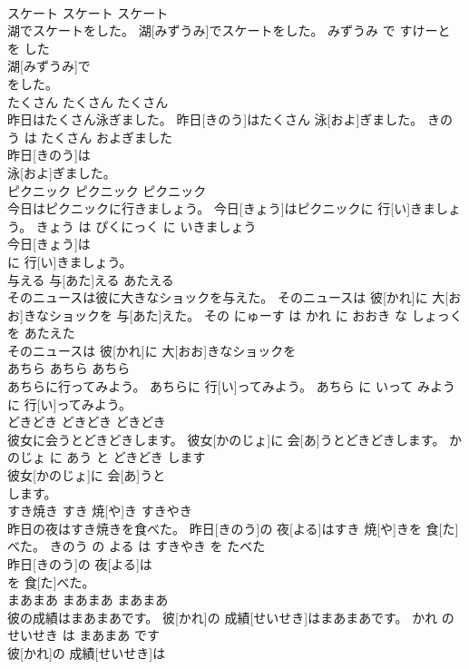 \documentclass[8pt]{extreport}
\begin{document}
\begin{CJK}{UTF8}{min}
\\	スケート	スケート	スケート	
\\	湖でスケートをした。	湖[みずうみ]でスケートをした。	みずうみ で すけーと を した	
\\	湖[みずうみ]で
\\	をした。			
\\	たくさん	たくさん	たくさん	
\\	昨日はたくさん泳ぎました。	昨日[きのう]はたくさん 泳[およ]ぎました。	きのう は たくさん およぎました	
\\	昨日[きのう]は
\\	泳[およ]ぎました。			
\\	ピクニック	ピクニック	ピクニック	
\\	今日はピクニックに行きましょう。	今日[きょう]はピクニックに 行[い]きましょう。	きょう は ぴくにっく に いきましょう	
\\	今日[きょう]は
\\	に 行[い]きましょう。			
\\	与える	与[あた]える	あたえる	
\\	そのニュースは彼に大きなショックを与えた。	そのニュースは 彼[かれ]に 大[おお]きなショックを 与[あた]えた。	その にゅーす は かれ に おおき な しょっく を あたえた	
\\	そのニュースは 彼[かれ]に 大[おお]きなショックを
\\	あちら	あちら	あちら	
\\	あちらに行ってみよう。	あちらに 行[い]ってみよう。	あちら に いって みよう	
\\	に 行[い]ってみよう。			
\\	どきどき	どきどき	どきどき	
\\	彼女に会うとどきどきします。	彼女[かのじょ]に 会[あ]うとどきどきします。	かのじょ に あう と どきどき します	
\\	彼女[かのじょ]に 会[あ]うと
\\	します。			
\\	すき焼き	すき 焼[や]き	すきやき	
\\	昨日の夜はすき焼きを食べた。	昨日[きのう]の 夜[よる]はすき 焼[や]きを 食[た]べた。	きのう の よる は すきやき を たべた	
\\	昨日[きのう]の 夜[よる]は
\\	を 食[た]べた。			
\\	まあまあ	まあまあ	まあまあ	
\\	彼の成績はまあまあです。	彼[かれ]の 成績[せいせき]はまあまあです。	かれ の せいせき は まあまあ です	
\\	彼[かれ]の 成績[せいせき]は

\end{CJK}
\end{document}
